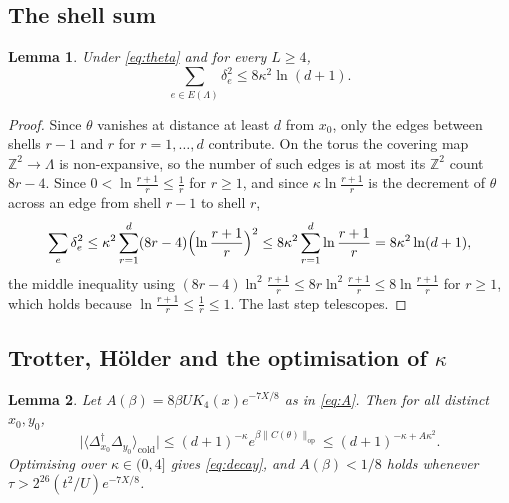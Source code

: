\documentclass[11pt]{article}
\theoremstyle{plain}
\newtheorem{lemma}{Lemma}
\theoremstyle{definition}
\newcommand{\Dop}{\Delta}
\begin{document}
\subsection{The shell sum}

\begin{lemma}\label{lem:shell}
Under \eqref{eq:theta} and for every $L\ge4$,
\begin{equation}\label{eq:shell}
\sum_{e\in E(\Lambda)}\delta_e^{2}\le8\kappa^{2}\ln(d+1).
\end{equation}
\end{lemma}

\begin{proof}
Since $\theta$ vanishes at distance at least $d$ from $x_0$, only the edges
between shells $r-1$ and $r$ for $r=1,\dots,d$ contribute. On the torus the
covering map $\mathbb{Z}^{2}\to\Lambda$ is non-expansive, so the number of such
edges is at most its $\mathbb{Z}^{2}$ count $8r-4$. Since $0<\ln\frac{r+1}{r}\le
\frac1r$ for $r\ge1$, and since $\kappa\ln\frac{r+1}{r}$ is the decrement of
$\theta$ across an edge from shell $r-1$ to shell $r$,
\begin{equation}\label{eq:shell2}
\sum_{e}\delta_e^{2}\le\kappa^{2}\sum_{r=1}^{d}(8r-4)\Bigl(\ln\frac{r+1}{r}\Bigr)^{2}
\le8\kappa^{2}\sum_{r=1}^{d}\ln\frac{r+1}{r}=8\kappa^{2}\ln(d+1),
\end{equation}
the middle inequality using
$(8r-4)\ln^{2}\frac{r+1}{r}\le8r\ln^{2}\frac{r+1}{r}\le8\ln\frac{r+1}{r}$ for
$r\ge1$, which holds because $\ln\frac{r+1}{r}\le\frac1r\le1$. The last step telescopes.
\end{proof}

\subsection{Trotter, H\"older and the optimisation of \texorpdfstring{$\kappa$}{kappa}}

\begin{lemma}\label{lem:holder}
Let $A(\beta)=8\beta UK_4(x)e^{-7X/8}$ as in \eqref{eq:A}. Then for all distinct
$x_0,y_0$,
\begin{equation}\label{eq:holderchain}
\bigl|\langle\Dop_{x_0}^\dagger\Dop_{y_0}\rangle_{\mathrm{cold}}\bigr|
\le(d+1)^{-\kappa}e^{\beta\|C(\theta)\|_{\mathrm{op}}}
\le(d+1)^{-\kappa+A\kappa^{2}} .
\end{equation}
Optimising over $\kappa\in(0,4]$ gives \eqref{eq:decay}, and
$A(\beta)<1/8$ holds whenever $\tau>2^{26}(t^{2}/U)e^{-7X/8}$.
\end{lemma}
\end{document}

